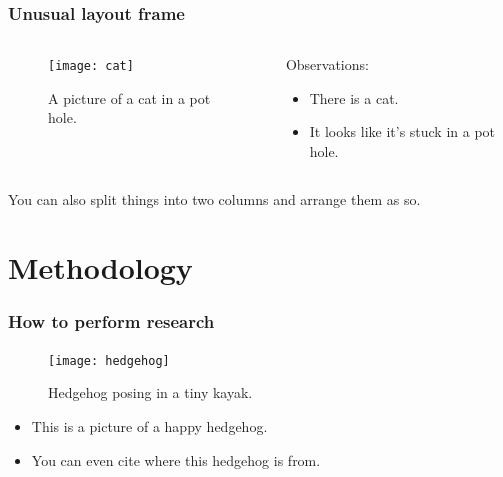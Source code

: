\documentclass[10pt,xcolor=table]{beamer}
\begin{document}
\begin{frame}
  \frametitle{Unusual layout frame}
  \begin{columns}
    \begin{column}{.44\textwidth}
      \begin{figure}[t]
        \texttt{[image: cat]}
        \caption{A picture of a cat in a pot hole\footnotemark[1].}
      \end{figure}
    \end{column}
    \begin{column}{.60\textwidth}
      Observations:
        \begin{itemize}
        \item There is a cat.
        \item It looks like it's stuck in a pot hole.
        \end{itemize}
    \end{column}
  \end{columns}

  You can also split things into two columns and arrange them as so.
  
  \vspace{0.8cm}
\end{frame}

\section{Methodology}
\begin{frame}
  \frametitle{How to perform research}
  \begin{figure}
    \texttt{[image: hedgehog]}
    \caption{Hedgehog posing in a tiny kayak.}
  \end{figure}
  \vspace{-0.4cm}
  \begin{itemize}
  \item This is a picture of a happy hedgehog.
  \item You can even cite where this hedgehog is from.
  \end{itemize}
  \vspace{0.15cm}
\end{frame}
\end{document}
